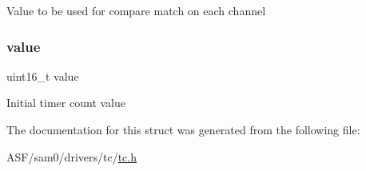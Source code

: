 Value to be used for compare match on each channel \mbox{\label{structtc__16bit__config_a900b69af7d674b8db3bceae754b4955a}} 
\subsubsection{\texorpdfstring{value}{value}}
{\footnotesize\ttfamily uint16\+\_\+t value}

Initial timer count value 

The documentation for this struct was generated from the following file\+:\begin{DoxyCompactItemize}
\item 
A\+S\+F/sam0/drivers/tc/\mbox{\hyperlink{drivers_2tc_2tc_8h}{tc.\+h}}\end{DoxyCompactItemize}
